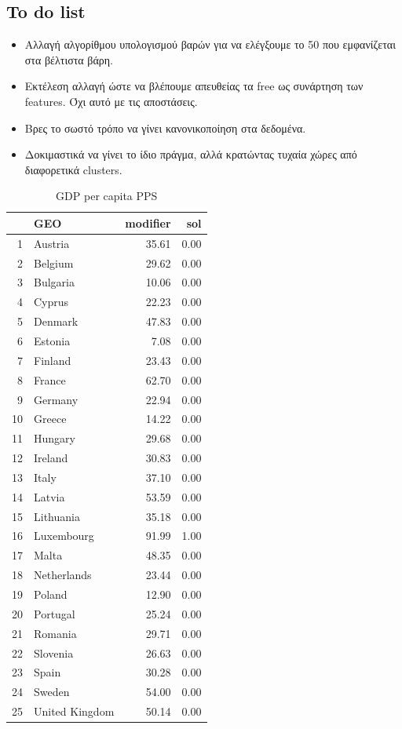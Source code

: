 \documentclass[a4paper,twoside,10pt]{article}
\begin{document}
\subsection{To do list}
\begin{itemize}
	\item Αλλαγή αλγορίθμου υπολογισμού βαρών για να ελέγξουμε το 50 που εμφανίζεται στα βέλτιστα βάρη.
	\item Εκτέλεση αλλαγή ώστε να βλέπουμε απευθείας τα free ως συνάρτηση των features. Όχι αυτό με τις αποστάσεις.
	\item Βρες το σωστό τρόπο να γίνει κανονικοποίηση στα δεδομένα.
	\item Δοκιμαστικά να γίνει το ίδιο πράγμα, αλλά κρατώντας τυχαία χώρες από διαφορετικά clusters. 
\end{itemize}


\begin{table}[H]
	\centering
	\begin{tabular}{|r|lr|r|}
		\hline
		& GEO & modifier & sol \\
		\hline
		1 & Austria & 35.61 & 0.00 \\
		2 & Belgium & 29.62 & 0.00 \\
		3 & Bulgaria & 10.06 & 0.00 \\
		4 & Cyprus & 22.23 & 0.00 \\
		5 & Denmark & 47.83 & 0.00 \\\hline
		6 & Estonia & 7.08 & 0.00 \\
		7 & Finland & 23.43 & 0.00 \\
		8 & France & 62.70 & 0.00 \\
		9 & Germany & 22.94 & 0.00 \\
		10 & Greece & 14.22 & 0.00 \\ \hline
		11 & Hungary & 29.68 & 0.00 \\
		12 & Ireland & 30.83 & 0.00 \\
		13 & Italy & 37.10 & 0.00 \\
		14 & Latvia & 53.59 & 0.00 \\
		15 & Lithuania & 35.18 & 0.00 \\ \hline
		16 & Luxembourg & 91.99 & 1.00 \\
		17 & Malta & 48.35 & 0.00 \\
		18 & Netherlands & 23.44 & 0.00 \\
		19 & Poland & 12.90 & 0.00 \\
		20 & Portugal & 25.24 & 0.00 \\ \hline
		21 & Romania & 29.71 & 0.00 \\
		22 & Slovenia & 26.63 & 0.00 \\
		23 & Spain & 30.28 & 0.00 \\
		24 & Sweden & 54.00 & 0.00 \\
		25 & United Kingdom & 50.14 & 0.00 \\
		\hline
	\end{tabular}
	\caption{GDP per capita PPS}

\end{table}
\end{document}
